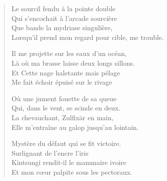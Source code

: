 \begin{verse}%
  \quatrain%
  Le sourcil fendu à la pointe double\\
  Qui s’encochait à l’arcade sourcière\\
  Que bande la mydriase singulière,\\
  Lorsqu’il prend mon regard pour cible, me trouble.

  Il me projette sur les eaux d’un océan,\\
  Là où ma brasse laisse deux longs sillons.\\
  Et Cette nage haletante mais pélage%
  \\
  Me fait échoir épuisé sur le rivage

  Où une jument fouette de sa queue\\
  Qui, dans le vent, se scinde en deux.\\
  La chevauchant, Zulfixār en main,\\
  Elle m’entraîne au galop jusqu’au lointain.

  Mystère du défaut qui se fit victoire.\\
  Surlignant de l’encre l’iris \label{foot.barroco}\\
  Kintsungi rendit-il le mammaire ivoire\\
  Et mon cœur palpite sous les pectoraux.
\end{verse}



